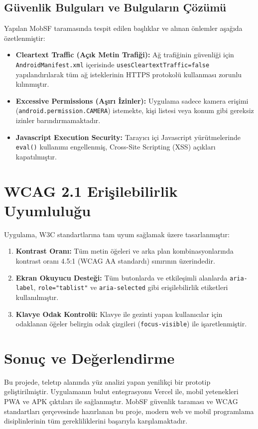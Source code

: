 \documentclass[12pt,a4paper]{article}
\begin{document}
\subsection{Güvenlik Bulguları ve Bulguların Çözümü}
Yapılan MobSF taramasında tespit edilen başlıklar ve alınan önlemler aşağıda özetlenmiştir:
\begin{itemize}
    \item \textbf{Cleartext Traffic (Açık Metin Trafiği):} Ağ trafiğinin güvenliği için \lstinline{AndroidManifest.xml} içerisinde \lstinline{usesCleartextTraffic=false} yapılandırılarak tüm ağ isteklerinin HTTPS protokolü kullanması zorunlu kılınmıştır.
    \item \textbf{Excessive Permissions (Aşırı İzinler):} Uygulama sadece kamera erişimi (\lstinline{android.permission.CAMERA}) istemekte, kişi listesi veya konum gibi gereksiz izinler barındırmamaktadır.
    \item \textbf{Javascript Execution Security:} Tarayıcı içi Javascript yürütmelerinde \lstinline{eval()} kullanımı engellenmiş, Cross-Site Scripting (XSS) açıkları kapatılmıştır.
\end{itemize}

\section{WCAG 2.1 Erişilebilirlik Uyumluluğu}
Uygulama, W3C standartlarına tam uyum sağlamak üzere tasarlanmıştır:
\begin{enumerate}
    \item \textbf{Kontrast Oranı:} Tüm metin öğeleri ve arka plan kombinasyonlarında kontrast oranı 4.5:1 (WCAG AA standardı) sınırının üzerindedir.
    \item \textbf{Ekran Okuyucu Desteği:} Tüm butonlarda ve etkileşimli alanlarda \lstinline{aria-label}, \lstinline{role="tablist"} ve \lstinline{aria-selected} gibi erişilebilirlik etiketleri kullanılmıştır.
    \item \textbf{Klavye Odak Kontrolü:} Klavye ile gezinti yapan kullanıcılar için odaklanan öğeler belirgin odak çizgileri (\lstinline{focus-visible}) ile işaretlenmiştir.
\end{enumerate}

\section{Sonuç ve Değerlendirme}
Bu projede, teletıp alanında yüz analizi yapan yenilikçi bir prototip geliştirilmiştir. Uygulamanın bulut entegrasyonu Vercel ile, mobil yetenekleri PWA ve APK çıktıları ile sağlanmıştır. MobSF güvenlik taraması ve WCAG standartları çerçevesinde hazırlanan bu proje, modern web ve mobil programlama disiplinlerinin tüm gerekliliklerini başarıyla karşılamaktadır.
\end{document}
